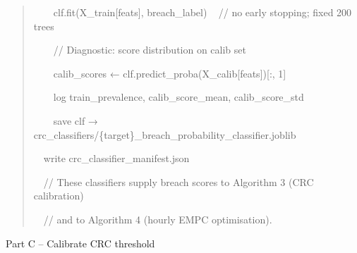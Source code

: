 \documentclass[11pt]{article}
\begin{document}
\begin{quote}
~~~~clf.fit(X\_train{[}feats{]}, breach\_label) ~ // no early stopping;
fixed 200 trees

~~~~// Diagnostic: score distribution on calib set

~~~~calib\_scores ← clf.predict\_proba(X\_calib{[}feats{]}){[}:, 1{]}

~~~~log train\_prevalence, calib\_score\_mean, calib\_score\_std

~~~~save clf →
crc\_classifiers/\{target\}\_breach\_probability\_classifier.joblib

~~write crc\_classifier\_manifest.json

~~// These classifiers supply breach scores to Algorithm 3 (CRC
calibration)

~~// and to Algorithm 4 (hourly EMPC optimisation).
\end{quote}

Part C -- Calibrate CRC threshold
\end{document}
